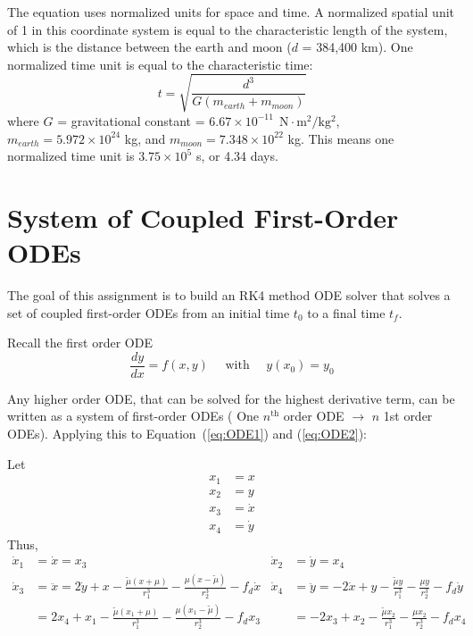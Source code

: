 \documentclass{article}
\newcommand{\deriv}[2]{\frac{d#1}{d#2}}
\begin{document}
\vspace{\baselineskip}

The equation uses normalized units for space and time. A normalized spatial unit of 1 in this coordinate
system is equal to the characteristic length of the system, which is the distance between the earth and moon
($d$ = 384,400 km). One normalized time unit is equal to the characteristic time:
\begin{equation*}
    t = \sqrt{\frac{d^3}{G\left(m_{earth} + m_{moon}\right)}} 
\end{equation*}
where $G$ = gravitational constant = $6.67 \times 10^{-11} \SI{}{\ \N\cdot\m^2/\kg^2}$, $m_{earth} = 5.972 \times 10^{24}$ kg, and $m_{moon} = 7.348 \times 10^{22}$ kg. This means one normalized time unit is $3.75 \times 10^5$ s, or 4.34 days.

\pagebreak

\section{System of Coupled First-Order ODEs}

The goal of this assignment is to build an RK4 method ODE solver that solves a set of coupled first-order ODEs from an initial time $t_0$ to a final time $t_f$.

\vspace{\baselineskip}

Recall the first order ODE
\begin{equation*}
    \deriv{y}{x} = f(x,y) \quad \text{ with } \quad y(x_0) = y_0
\end{equation*}

Any higher order ODE, that can be solved for the highest derivative term, can be written as a system of first-order ODEs (\color{magenta} One $n^{\textrm{th}}$ order ODE $\rightarrow$ $n$ 1st order ODEs\color{white}). Applying this to Equation~(\ref{eq:ODE1}) and (\ref{eq:ODE2}):

\vspace{\baselineskip}

Let
\begin{align*}
    x_1 &= x \\
    x_2 &= y \\
    x_3 &= \dot{x} \\
    x_4 &= \dot{y}
\end{align*}
Thus, 
\begin{align*}
    \dot{x}_1 &= \dot{x} = x_3  &  \dot{x}_2 &= \dot{y} = x_4
    \\
    \dot{x}_3 &= \ddot{x} = 2\dot{y} + x - \frac{\tilde{\mu} \left(x+\mu\right)}{r_1^3} - \frac{\mu \left(x-\tilde{\mu}\right)}{r_2^3} - f_d \dot{x} 
    & \dot{x}_4 &= \ddot{y} = -2\dot{x} + y - \frac{\tilde{\mu}y}{r_1^3} - \frac{\mu y}{r_2^3} - f_d\dot{y}
    \\
    &= 2x_4 + x_1 - \frac{\tilde{\mu} \left(x_1+\mu\right)}{r_1^3} - \frac{\mu \left(x_1-\tilde{\mu}\right)}{r_2^3} - f_d x_3
    & &= -2x_3 + x_2 - \frac{\tilde{\mu}x_2}{r_1^3} - \frac{\mu x_2}{r_2^3} - f_d x_4
\end{align*}
\end{document}
